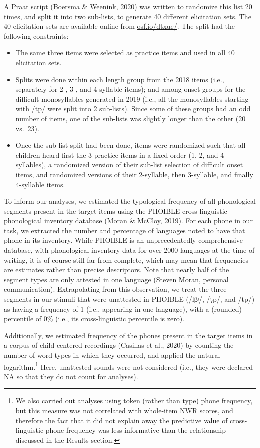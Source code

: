 \documentclass[english,,man,floatsintext]{apa6}
\providecommand{\tightlist}{%
  \setlength{\itemsep}{0pt}\setlength{\parskip}{0pt}}
\begin{document}
A Praat script (Boersma \& Weenink, 2020) was written to randomize this list 20 times, and split it into two sub-lists, to generate 40 different elicitation sets. The 40 elicitation sets are available online from \href{https://osf.io/dtxue/}{osf.io/dtxue/}. The split had the following constraints:

\begin{itemize}
\tightlist
\item
  The same three items were selected as practice items and used in all 40 elicitation sets.
\item
  Splits were done within each length group from the 2018 items (i.e., separately for 2-, 3-, and 4-syllable items); and among onset groups for the difficult monosyllables generated in 2019 (i.e., all the monosyllables starting with /tp/ were split into 2 sub-lists). Since some of these groups had an odd number of items, one of the sub-lists was slightly longer than the other (20 vs.~23).
\item
  Once the sub-list split had been done, items were randomized such that all children heard first the 3 practice items in a fixed order (1, 2, and 4 syllables), a randomized version of their sub-list selection of difficult onset items, and randomized versions of their 2-syllable, then 3-syllable, and finally 4-syllable items.
\end{itemize}

To inform our analyses, we estimated the typological frequency of all phonological segments present in the target items using the PHOIBLE cross-linguistic phonological inventory database (Moran \& McCloy, 2019). For each phone in our task, we extracted the number and percentage of languages noted to have that phone in its inventory. While PHOIBLE is an unprecedentedly comprehensive database, with phonological inventory data for over 2000 languages at the time of writing, it is of course still far from complete, which may mean that frequencies are estimates rather than precise descriptors. Note that nearly half of the segment types are only attested in one language (Steven Moran, personal communication). Extrapolating from this observation, we treat the three segments in our stimuli that were unattested in PHOIBLE (/lβʲ/, /ṭp/, and /tp/) as having a frequency of 1 (i.e., appearing in one language), with a (rounded) percentile of 0\% (i.e., its cross-linguistic percentile is zero).

Additionally, we estimated frequency of the phones present in the target items in a corpus of child-centered recordings (Casillas et al., 2020) by counting the number of word types in which they occurred, and applied the natural logarithm.\footnote{We also carried out analyses using token (rather than type) phone frequency, but this measure was not correlated with whole-item NWR scores, and therefore the fact that it did not explain away the predictive value of cross-linguistic phone frequency was less informative than the relationship discussed in the Results section.} Here, unattested sounds were not considered (i.e., they were declared NA so that they do not count for analyses).
\end{document}
